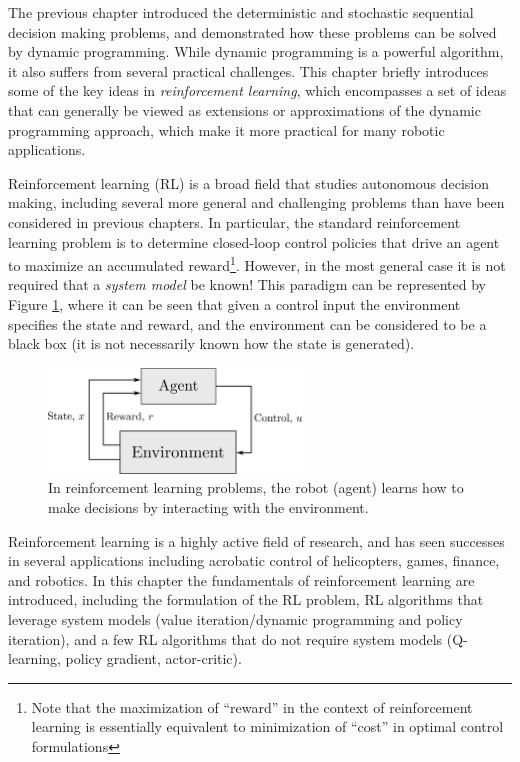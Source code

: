 The previous chapter introduced the deterministic and stochastic sequential decision making problems, and demonstrated how these problems can be solved by dynamic programming. 
While dynamic programming is a powerful algorithm, it also suffers from several practical challenges. This chapter briefly introduces some of the key ideas in \textit{reinforcement learning}\cite{Bertsekas2019}\cite{SuttonBarto2018}, which encompasses a set of ideas that can generally be viewed as extensions or approximations of the dynamic programming approach, which make it more practical for many robotic applications.

Reinforcement learning (RL) is a broad field that studies autonomous decision making, including several more general and challenging problems than have been considered in previous chapters. 
In particular, the standard reinforcement learning problem is to determine closed-loop control policies that drive an agent to maximize an accumulated reward\footnote{Note that the maximization of ``reward'' in the context of reinforcement learning is essentially equivalent to minimization of ``cost'' in optimal control formulations}. However, in the most general case it is not required that a \textit{system model} be known! This paradigm can be represented by Figure \ref{fig:rl}, where it can be seen that given a control input the environment specifies the state and reward, and the environment can be considered to be a black box (it is not necessarily known how the state is generated).
\begin{figure}[ht]
    \centering
    \includegraphics[width=0.6\textwidth]{tex/figs/ch21_figs/rl.png}
    \caption{In reinforcement learning problems, the robot (agent) learns how to make decisions by interacting with the environment.}
    \label{fig:rl}
\end{figure}

Reinforcement learning is a highly active field of research, and has seen successes in several applications including acrobatic control of helicopters, games, finance, and robotics. In this chapter the fundamentals of reinforcement learning are introduced, including the formulation of the RL problem, RL algorithms that leverage system models (value iteration/dynamic programming and policy iteration), and a few RL algorithms that do not require system models (Q-learning, policy gradient, actor-critic). 


